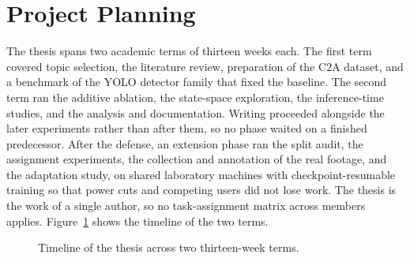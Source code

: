 \section{Project Planning}
The thesis spans two academic terms of thirteen weeks each. The first term
covered topic selection, the literature review, preparation of the C2A
dataset, and a benchmark of the YOLO detector family that fixed the baseline.
The second term ran the additive ablation, the state-space exploration, the
inference-time studies, and the analysis and documentation. Writing proceeded
alongside the later experiments rather than after them, so no phase waited on
a finished predecessor. After the defense, an extension phase ran the split
audit, the assignment experiments, the collection and annotation of the real
footage, and the adaptation study, on shared laboratory machines with
checkpoint-resumable training so that power cuts and competing users did not
lose work. The thesis is the work of a single author, so no task-assignment
matrix across members applies. Figure~\ref{fig:gantt} shows the timeline of
the two terms.

\begin{figure}[tbp]
  \centering
  \resizebox{\linewidth}{!}{}
  \caption{Timeline of the thesis across two thirteen-week terms.}
  \label{fig:gantt}
\end{figure}

